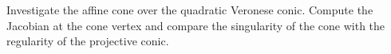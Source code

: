 \begin{problem}\label{chal:vi37-04}
Investigate the affine cone over the quadratic Veronese conic. Compute the Jacobian at the cone vertex and compare the singularity of the cone with the regularity of the projective conic.
\end{problem}
